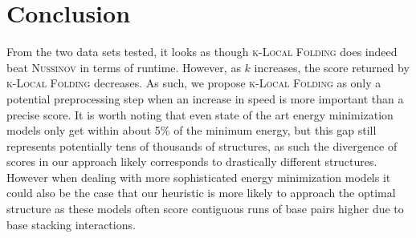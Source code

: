 \documentclass[11pt]{article}
\newcommand{\klf}{\textsc{k-Local Folding}\xspace}
\newcommand{\rf}{\textsc{Nussinov}\xspace}
\begin{document}
\section{Conclusion}

From the two data sets tested, it looks as though \klf does indeed beat \rf in terms of runtime. However, as $k$ increases, the score returned by \klf decreases. As such, we propose \klf as only a potential preprocessing step when an increase in speed is more important than a precise score. It is worth noting that even state of the art energy minimization models only get within about 5\% of the minimum energy, but this gap still represents potentially tens of thousands of structures, as such the divergence of scores in our approach likely corresponds to drastically different structures. However when dealing with more sophisticated energy minimization models it could also be the case that our heuristic is more likely to approach the optimal structure as these models often score contiguous runs of base pairs higher due to base stacking interactions.  
\end{document}
